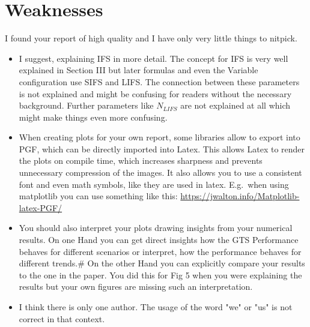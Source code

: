 \documentclass[12pt,british,a4paper]{article}
\begin{document}
\section{Weaknesses}
I found your report of high quality and I have only very little things to nitpick.
\begin{itemize}
    \item I suggest, explaining IFS in more detail.
    The concept for IFS is very well explained in Section III but later formulas and even the Variable configuration use SIFS and LIFS.
    The connection between these parameters is not explained and might be confusing for readers without the necessary background.
    Further parameters like $N_{LIFS}$ are not explained at all which might make things even more confusing.
    \item When creating plots for your own report, some libraries allow to export into PGF, which can be directly imported into Latex.
    This allows Latex to render the plots on compile time, which increases sharpness and prevents unnecessary compression of the images.
    It also allows you to use a consistent font and even math symbols, like they are used in latex.
    E.g.\ when using matplotlib you can use something like this: \url{https://jwalton.info/Matplotlib-latex-PGF/}
    \item You should also interpret your plots drawing insights from your numerical results.
    On one Hand you can get direct insights how the GTS Performance behaves for different scenarios or interpret, how the performance behaves for different trends.#
    On the other Hand you can explicitly compare your results to the one in the paper.
    You did this for Fig 5 when you were explaining the results but your own figures are missing such an interpretation.
    \item I think there is only one author.
    The usage of the word "we" or "us" is not correct in that context.
\end{itemize}
\end{document}
